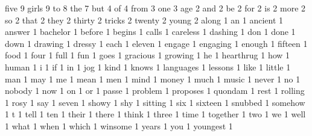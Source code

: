 \begin{myverbbox}[\small]{\voutput}
    five 9
    girls 9
    to 8
    the 7
    but 4
    of 4
    from 3
    one 3
    age 2
    and 2
    be 2
    for 2
    is 2
    more 2
    so 2
    that 2
    they 2
    thirty 2
    tricks 2
    twenty 2
    young 2
    along 1
    an 1
    ancient 1
    answer 1
    bachelor 1
    before 1
    begins 1
    calls 1
    careless 1
    dashing 1
    don 1
    done 1
    down 1
    drawing 1
    dressy 1
    each 1
    eleven 1
    engage 1
    engaging 1
    enough 1
    fifteen 1
    food 1
    four 1
    full 1
    fun 1
    goes 1
    gracious 1
    growing 1
    he 1
    hearthrug 1
    how 1
    human 1
    i 1
    if 1
    in 1
    jog 1
    kind 1
    knows 1
    languages 1
    lessons 1
    like 1
    little 1
    man 1
    may 1
    me 1
    mean 1
    men 1
    mind 1
    money 1
    much 1
    music 1
    never 1
    no 1
    nobody 1
    now 1
    on 1
    or 1
    passe 1
    problem 1
    proposes 1
    quondam 1
    rest 1
    rolling 1
    rosy 1
    say 1
    seven 1
    showy 1
    shy 1
    sitting 1
    six 1
    sixteen 1
    snubbed 1
    somehow 1
    t 1
    tell 1
    ten 1
    their 1
    there 1
    think 1
    three 1
    time 1
    together 1
    two 1
    we 1
    well 1
    what 1
    when 1
    which 1
    winsome 1
    years 1
    you 1
    youngest 1
\end{myverbbox}

